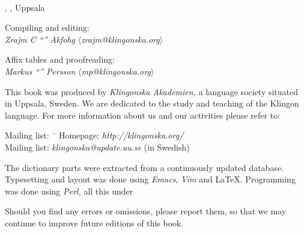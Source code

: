 \begin{center}
  \\
  \edition{}, \compiledate{}, Uppsala

  \vspace{4mm}
  \small Compiling and editing: \\
  \textit{Zrajm C ``'' Akfohg}
  $\langle$\textit{zrajm@klingonska.org}$\rangle$ 

  \vspace{2mm}
  Affix tables and proofreading:\\
  \textit{Markus ``'' Persson}
  $\langle$\textit{mp@klingonska.org}$\rangle$
\end{center}


\small\noindent This book was produced by \textit{Kling\-on\-ska
Aka\-demi\-en,} a language society situated in Uppsala, Sweden. We are
dedicated to the study and teaching of the Klingon language. For more
information about us and our activities please refer to:

\begin{tabbing}
\indent Mailing list: \ \= \kill
\indent Homepage: \> \textit{http://klingonska.org/}\\
\indent Mailing list: \> \textit{klingonska@update.uu.se} (in Swedish)
\end{tabbing}

\noindent The dictionary parts were extracted from a continuously
updated database. Typesetting and layout was done using
\textit{Emacs}, \textit{Vim} and \LaTeX. Programming was done using
\textit{Perl,} all this under 

Should you find any errors or omissions, please report them, so that
we may continue to improve future editions of this book.

\newpage
\normalsize
